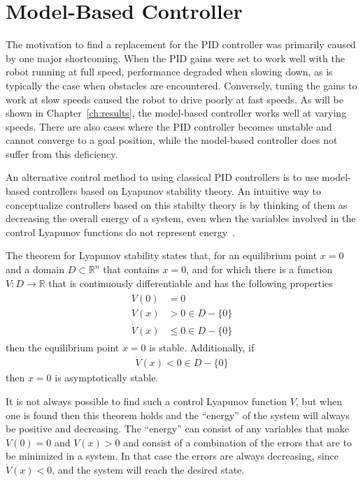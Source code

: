 \section{Model-Based Controller}%
\label{sec:lyapunov}
The motivation to find a replacement for the PID controller was primarily caused by one major shortcoming. When the PID gains were set to work well with the robot running at full speed, performance degraded when slowing down, as is typically the case when obstacles are encountered. Conversely, tuning the gains to work at slow speeds caused the robot to drive poorly at fast speeds. As will be shown in Chapter~\ref{ch:results}, the model-based controller works well at varying speeds. There are also cases where the PID controller becomes unstable and cannot converge to a goal position, while the model-based controller does not suffer from this deficiency.

An alternative control method to using classical PID controllers is to use model-based controllers based on Lyapunov stability theory. An intuitive way to conceptualize controllers based on this stabilty theory is by thinking of them as decreasing the overall energy of a system, even when the variables involved in the control Lyapunov functions do not represent energy~\cite{Khalil02}.

The theorem for Lyapunov stability states that, for an equilibrium point $x=0$ and a domain $D\subset\mathbb{R}^n$ that contains $x=0$, and for which there is a function $V:D\to\mathbb{R}$ that is continuously differentiable and has the following properties 
\begin{align}
\label{eq:lyapunovTheorem}
\begin{split}
V(0) &= 0 \\
V(x) &> 0 \in D-\{0\} \\
\dot{V}(x) &\leq 0 \in D-\{0\}
\end{split}
\end{align}
then the equilibrium point $x=0$ is stable. Additionally, if
\begin{align}
\label{eq:lyapunovAsymptoticStability}
\dot{V}(x) < 0 \in D - \{0\}
\end{align}
then $x=0$ is asymptotically stable.

It is not always possible to find such a control Lyapunov function $V$, but when one is found then this theorem holds and the ``energy'' of the system will always be positive and decreasing. The ``energy'' can consist of any variables that make $V(0) = 0$ and $V(x) > 0$ and consist of a combination of the errors that are to be minimized in a system. In that case the errors are always decreasing, since $\dot{V}(x) < 0$, and the system will reach the desired state.

